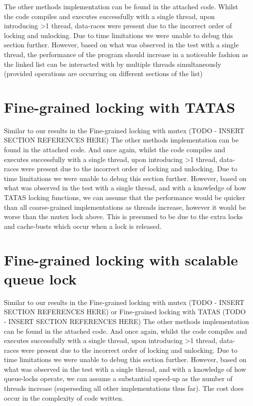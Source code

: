 The other methods implementation can be found in the attached code.
Whilst the code compiles and executes successfully with a single thread,
upon introducing >1 thread, data-races were present due to the incorrect order of locking 
and unlocking. 
Due to time limitations we were unable to debug this section further. 
However, based on what was observed in the test with a single thread, the performance of the 
program should increase in a noticeable fashion as the linked list can be interacted with by multiple threads 
simultaneously (provided operations are occurring on different sections of the list)

\section{Fine-grained locking with TATAS}

Similar to our results in the Fine-grained locking with mutex (TODO - INSERT SECTION REFERENCES HERE)
The other methods implementation can be found in the attached code.
And once again, whilst the code compiles and executes successfully with a single thread,
upon introducing >1 thread, data-races were present due to the incorrect order of locking 
and unlocking. 
Due to time limitations we were unable to debug this section further. 
However, based on what was observed in the test with a single thread, and with a knowledge of how TATAS locking functions,
we can assume that the performance would be quicker than all coarse-grained implementations as threads increase, however it would be worse than the mutex lock above.
This is presumed to be due to the extra locks and cache-busts which occur when a lock is released.

\section{Fine-grained locking with scalable queue lock}


Similar to our results in the Fine-grained locking with mutex (TODO - INSERT SECTION REFERENCES HERE) or Fine-grained locking with TATAS (TODO - INSERT SECTION REFERENCES HERE)
The other methods implementation can be found in the attached code.
And once again, whilst the code compiles and executes successfully with a single thread,
upon introducing >1 thread, data-races were present due to the incorrect order of locking 
and unlocking. 
Due to time limitations we were unable to debug this section further. 
However, based on what was observed in the test with a single thread, and with a knowledge of how queue-locks operate, 
we can assume a substantial speed-up as the number of threads increase (superseding all other implementations thus far). 
The cost does occur in the complexity of code written.